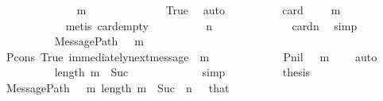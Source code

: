 \begin{isabellebody}
\ \ \ \ \ \ \ \ \isamarkupfalse%
\ {\isachardoublequoteopen}{\isasymsigma}{\isacharprime}\ {\isacharminus}\ {\isacharparenleft}{\isasymsigma}\ {\isasymunion}\ {\isacharbraceleft}m{\isacharbraceright}{\isacharparenright}\ {\isacharequal}\ {\isasymemptyset}{\isachardoublequoteclose}\isanewline
\ \ \ \ \ \ \ \ \ \ \isamarkupfalse%
\ True\ \isamarkupfalse%
\ auto\isanewline
\ \ \ \ \ \ \ \ \isamarkupfalse%
\ {\isachardoublequoteopen}card\ {\isacharparenleft}{\isasymsigma}{\isacharprime}\ {\isacharminus}\ {\isacharparenleft}{\isasymsigma}\ {\isasymunion}\ {\isacharbraceleft}m{\isacharbraceright}{\isacharparenright}{\isacharparenright}\ {\isacharequal}\ {}{\isachardoublequoteclose}\isanewline
\ \ \ \ \ \ \ \ \ \ \isamarkupfalse%
\ {\isacharparenleft}metis\ card{\isacharunderscore}empty{\isacharparenright}\isanewline
\ \ \ \ \ \ \ \ \isamarkupfalse%
\ {\isachardoublequoteopen}n\ {\isacharequal}\ {}{\isachardoublequoteclose}\isanewline
\ \ \ \ \ \ \ \ \ \ \isamarkupfalse%
\ cardn\ \isamarkupfalse%
\ simp\isanewline
\ \ \ \ \ \ \ \ \isamarkupfalse%
\ {\isachardoublequoteopen}MessagePath\ {\isasymsigma}\ {\isasymsigma}{\isacharprime}\ {\isacharbrackleft}m{\isacharbrackright}{\isachardoublequoteclose}\isanewline
\ \ \ \ \ \ \ \ \ \ \isamarkupfalse%
\ P{\isacharunderscore}cons\ True\ {\isacartoucheopen}immediately{\isacharunderscore}next{\isacharunderscore}message\ {\isacharparenleft}{\isasymsigma}{\isacharcomma}\ m{\isacharparenright}{\isacartoucheclose}\ \isanewline
\ \ \ \ \ \ \ \ \ \ \isamarkupfalse%
\ P{\isacharunderscore}nil\ {\isacartoucheopen}{\isasymsigma}\ {\isasymunion}\ {\isacharbraceleft}m{\isacharbraceright}\ {\isasymin}\ {\isasymSigma}{\isacartoucheclose}\ \isamarkupfalse%
\ auto\isanewline
\ \ \ \ \ \ \ \ \isamarkupfalse%
\ {\isachardoublequoteopen}length\ {\isacharbrackleft}m{\isacharbrackright}\ {\isacharequal}\ Suc\ {}{\isachardoublequoteclose}\isanewline
\ \ \ \ \ \ \ \ \ \ \isamarkupfalse%
\ simp\isanewline
\ \ \ \ \ \ \ \ \isamarkupfalse%
\ {\isacharquery}thesis\isanewline
\ \ \ \ \ \ \ \ \ \ \isamarkupfalse%
\ {\isacartoucheopen}MessagePath\ {\isasymsigma}\ {\isasymsigma}{\isacharprime}\ {\isacharbrackleft}m{\isacharbrackright}{\isacartoucheclose}\ {\isacartoucheopen}length\ {\isacharbrackleft}m{\isacharbrackright}\ {\isacharequal}\ Suc\ {}{\isacartoucheclose}\ {\isacartoucheopen}n\ {\isacharequal}\ {}{\isacartoucheclose}\ that\ \isamarkupfalse%

\end{isabellebody}
